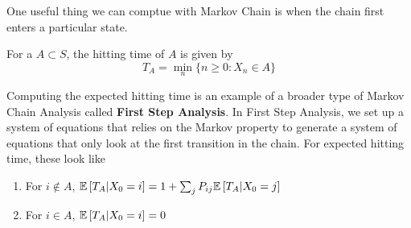 One useful thing we can comptue with Markov Chain is when the chain first enters a particular state.
\begin{definition}
	For a $A \subset S$, the hitting time of $A$ is given by \[
		T_A = \min_n \{ n\geq 0: X_n\in A\}
	\]
	\label{defn:hitting-time}
\end{definition}
Computing the expected hitting time is an example of a broader type of Markov Chain Analysis called \textbf{First Step Analysis}.
In First Step Analysis, we set up a system of equations that relies on the Markov property to generate a system of equations that only look at the first transition in the chain.
For expected hitting time, these look like
\begin{enumerate}
	\item For $i\not\in A$, $\mathbb{E}\left[T_A|X_0 = i\right] = 1 + \sum_j P_{ij} \mathbb{E}\left[T_A|X_0 = j\right]$
	\item For $i\in A$, $\mathbb{E}\left[T_A|X_0 = i\right] = 0$
\end{enumerate}
